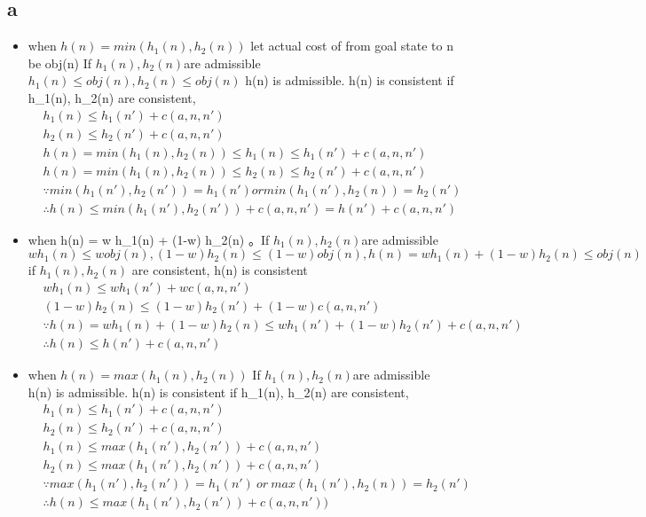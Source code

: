 \documentclass{article}
\begin{document}
\subsection{a}
\begin{itemize}
\item when $h(n) = min(h_1(n), h_2(n))$ let  actual cost of from goal state to n be obj(n) If $h_1(n), h_2(n) $are  admissible $h_1(n) \leq obj(n), h_2(n) \leq obj(n) $  h(n) is admissible. h(n) is consistent  if  h\_1(n), h\_2(n) are consistent, 
\begin{align*}
& h_1(n) \leq h_1(n') + c(a, n , n') \\
& h_2(n) \leq h_2(n') + c(a, n , n') \\
&  h (n) = min(h_1(n), h_2(n)) \leq h_1(n) \leq  h_1(n') + c(a, n , n') \\
 & h (n) =  min(h_1(n), h_2(n)) \leq h_2(n) \leq  h_2(n') + c(a, n , n') \\
 & \because min(h_1(n'), h_2(n')) = h_1(n') or min(h_1(n'), h_2(n)) = h_2(n') \\
 & \therefore h(n) \leq min(h_1(n'), h_2(n')) + c (a, n , n') = h(n') +  c(a, n , n') 
\end{align*}
\item 
when h(n) = w h\_1(n) + (1-w) h\_2(n) 。If $h_1(n), h_2(n) $are  admissible $wh_1(n) \leq w obj(n), (1-w)h_2(n) \leq (1-w) obj(n), h(n) = wh_1(n) + (1-w)h_2(n)  \leq obj(n) $ if  $h_1(n), h_2(n)$ are consistent, h(n) is consistent
\begin{align}
& w h_1(n) \leq  w h_1(n') + w c(a, n , n') \\
& (1-w)h_2(n) \leq  (1-w) h_2(n') + (1-w) c(a, n , n') \\
&\because h(n) = w h_1(n) + (1-w) h_2(n) \leq wh_1(n') +   (1-w) h_2(n') +  c(a, n , n') \\
& \therefore  h(n) \leq h(n') +   c(a, n , n')
\end{align}

\item when $h(n) = max(h_1(n), h_2(n))$  If $h_1(n), h_2(n) $are  admissible h(n) is admissible.  h(n) is consistent  if  h\_1(n), h\_2(n) are consistent, 
\begin{align*}
& h_1(n) \leq h_1(n') + c(a, n , n') \\
& h_2(n) \leq h_2(n') + c(a, n , n') \\
&  h_1(n) \leq max( h_1(n'), h_2(n')) + c(a, n , n') \\
&  h_2(n) \leq max( h_1(n'), h_2(n')) + c(a, n , n') \\
& \because max(h_1(n'), h_2(n')) = h_1(n')  \:or\:  max(h_1(n'), h_2(n)) = h_2(n') \\
 & \therefore h(n) \leq max( h_1(n'), h_2(n')) + c(a, n , n'))
\end{align*}
\end{itemize}
\end{document}
